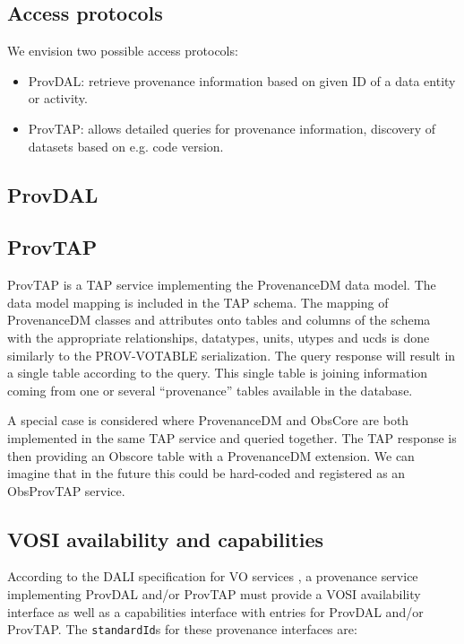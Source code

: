 \subsection{Access protocols}
\label{sec:access_protocols}
We envision two possible access protocols:
\begin{itemize}
\item ProvDAL: retrieve provenance information based on given ID of a data entity or activity.
\item ProvTAP: allows detailed queries for provenance information, discovery of datasets based on e.g. code version.
\end{itemize}

\subsection{ProvDAL}



\subsection{ProvTAP}
ProvTAP is a TAP service implementing the ProvenanceDM data model. The data model mapping is included in the TAP schema. The mapping of ProvenanceDM classes and attributes onto tables and columns of the schema with the appropriate relationships, datatypes, units, utypes and ucds is done similarly to the PROV-VOTABLE serialization. The query response will result in a single table according to the query.
This single table is joining information coming from one or several ``provenance'' tables available in the database.

A special case is considered where ProvenanceDM and ObsCore are both implemented in the same TAP service and queried together. The TAP response is then providing an Obscore table with a ProvenanceDM extension. We can imagine that in the future this could be hard-coded and registered as an ObsProvTAP service.






\subsection{VOSI availability and capabilities}
According to the DALI specification for VO services \citep{std:DALI}, a provenance service implementing ProvDAL and/or ProvTAP must provide a VOSI availability interface as well as a capabilities interface with entries for ProvDAL and/or ProvTAP. The \texttt{standardId}s for these provenance interfaces are:

